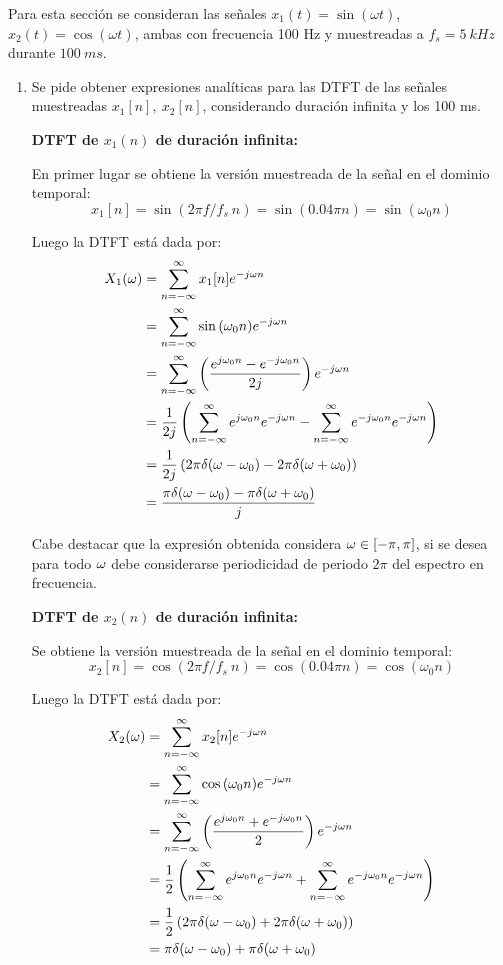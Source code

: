 Para esta sección se consideran las señales $x_1(t) = \sin{(\omega t)}$, $x_2(t) = \cos{(\omega t)}$, ambas con frecuencia 100 Hz y muestreadas a $f_s = 5~kHz$ durante $100~ms$.

\begin{enumerate}
    \item Se pide obtener expresiones analíticas para las DTFT de las señales muestreadas $x_1[n],~ x_2[n]$, considerando duración infinita y los 100 ms.
    
    \textbf{DTFT de $x_1(n)$ de duración infinita:}
    
    En primer lugar se obtiene la versión muestreada de la señal en el dominio temporal:
    $$ x_1[n] = \sin{(2\pi f/f_s~n)} =  \sin{(0.04\pi n)} = \sin{(\omega_0 n)}$$
    
    Luego la DTFT está dada por:
\begin{align*}
    X_1(\omega) &= \sum_{n=-\infty}^{\infty}x_1[n]e^{-j\omega n}\\
    &= \sum_{n=-\infty}^{\infty}\sin{(\omega_0 n)}e^{-j\omega n}\\
    &= \sum_{n=-\infty}^{\infty}\left(\dfrac{e^{j\omega_0n} - e^{-j\omega_0n} }{2j}\right)e^{-j\omega n}\\
    &= \dfrac{1}{2j}\left(\sum_{n=-\infty}^{\infty}e^{j\omega _0n}e^{-j\omega n} - \sum_{n=-\infty}^{\infty}e^{-j\omega_0 n}e^{-j\omega n}\right)\\
    &= \dfrac{1}{2j}\left(2\pi\delta(\omega-\omega_0) - 2\pi\delta(\omega+\omega_0)\right)\\
    &= \dfrac{\pi\delta(\omega-\omega_0) - \pi\delta(\omega+\omega_0)}{j}\\
\end{align*}

    Cabe destacar que la expresión obtenida considera $\omega \in [-\pi, \pi] $, si se desea para todo $\omega$ debe considerarse periodicidad de periodo $2\pi$ del espectro en frecuencia.
    
    \textbf{DTFT de $x_2(n)$ de duración infinita:}
    
    Se obtiene la versión muestreada de la señal en el dominio temporal:
    $$ x_2[n] = \cos{(2\pi f/f_s~n)} =  \cos{(0.04\pi n)} = \cos{(\omega_0 n)}$$
    
    Luego la DTFT está dada por:
\begin{align*}
    X_2(\omega) &= \sum_{n=-\infty}^{\infty}x_2[n]e^{-j\omega n}\\
    &= \sum_{n=-\infty}^{\infty}\cos{(\omega_0 n)}e^{-j\omega n}\\
    &= \sum_{n=-\infty}^{\infty}\left(\dfrac{e^{j\omega_0n} + e^{-j\omega_0n} }{2}\right)e^{-j\omega n}\\
    &= \dfrac{1}{2}\left(\sum_{n=-\infty}^{\infty}e^{j\omega _0n}e^{-j\omega n} + \sum_{n=-\infty}^{\infty}e^{-j\omega_0 n}e^{-j\omega n}\right)\\
    &= \dfrac{1}{2}\left(2\pi\delta(\omega-\omega_0) + 2\pi\delta(\omega+\omega_0)\right)\\
    &= \pi\delta(\omega-\omega_0) + \pi\delta(\omega+\omega_0)\\
\end{align*}


\end{enumerate}
